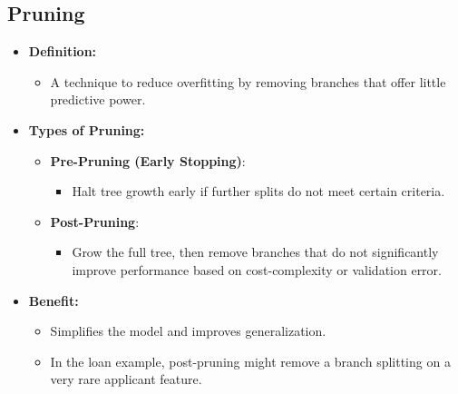 \documentclass[10pt]{article}
\begin{document}
\subsection{Pruning}
\begin{itemize}
    \item \textbf{Definition:}
    \begin{itemize}
        \item A technique to reduce overfitting by removing branches that offer little predictive power.
    \end{itemize}

    \item \textbf{Types of Pruning:}
    \begin{itemize}
        \item \textbf{Pre-Pruning (Early Stopping)}:
        \begin{itemize}
            \item Halt tree growth early if further splits do not meet certain criteria.
        \end{itemize}
        \item \textbf{Post-Pruning}:
        \begin{itemize}
            \item Grow the full tree, then remove branches that do not significantly improve performance based on cost-complexity or validation error.
        \end{itemize}
    \end{itemize}

    \item \textbf{Benefit:}
    \begin{itemize}
        \item Simplifies the model and improves generalization.
        \item In the loan example, post-pruning might remove a branch splitting on a very rare applicant feature.
    \end{itemize}
\end{itemize}
\end{document}

